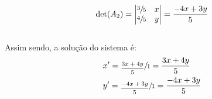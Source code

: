 \[
    \det(A_2) =
    \left|\begin{matrix}
        \sfrac{3}{5} & x \\
        \sfrac{4}{5} & y
    \end{matrix}\right|
    = \frac{-4x+3y}{5}
\]
\\

Assim sendo, a solução do sistema é:
\\

\begin{equation}
    \begin{aligned}
         & x' = \sfrac{\frac{3x+4y}{5}}{1} = \frac{3x+4y}{5}   \\
         & y' = \sfrac{\frac{-4x+3y}{5}}{1} = \frac{-4x+3y}{5}
    \end{aligned}
\end{equation}

